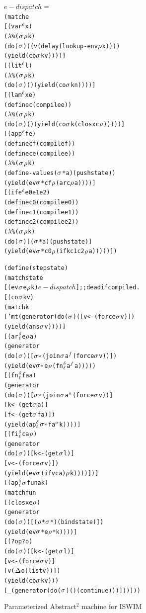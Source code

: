 \documentclass[preprint,onecolumn,9pt]{sigplanconf} %
\begin{document}
\begin{figure}
\begin{alltt}
\(e-dispatch =\)
(match e
  [(var\(\superscript\mlab\) x)
   (\(\lambda\)\% (\(\msto\) \(\menv\) k)
    (do (\(\msto\)) ((v (delay (lookup-env \(\menv\) x))))
      (yield (co \(\msto\) k v))))]
  [(lit\(\superscript\mlab\) l)
   (\(\lambda\)\% (\(\msto\) \(\menv\) k)
    (do (\(\msto\)) () (yield (co \(\msto\) k n))))]
  [(lam\(\superscript\mlab\) x e)
   (define c (compile e))
   (\(\lambda\)\% (\(\msto\) \(\menv\) k)
    (do (\(\msto\)) () (yield (co \(\msto\) k (clos x c \(\menv\))))))]
  [(app\(\superscript\mlab\) f e)
   (define cf (compile f))
   (define ce (compile e))
   (\(\lambda\)\% (\(\msto\) \(\menv\) k)
    (define-values (\(\msto\)* a) (push state))
    (yield (ev \(\msto\)* cf \(\menv\) (ar c \(\menv\) a))))]
  [(ife\(\superscript\mlab\) e0 e1 e2)
   (define c0 (compile e0))
   (define c1 (compile e1))
   (define c2 (compile e2))
   (\(\lambda\)\% (\(\msto\) \(\menv\) k)
     (do (\(\msto\)) [(\(\msto\)* a) (push state)]
      (yield (ev \(\msto\)* c0 \(\menv\) (ifk c1 c2 \(\menv\) a)))))])

(define (step state)
  (match state
    [(ev \(\msto\) e \(\menv\) k) \(e-dispatch\)] ;; dead if compiled.
    [(co \(\msto\) k v)
     (match k
       ['mt (generator (do (\(\msto\)) ([v <- (force \(\msto\) v)])
        (yield (ans \(\msto\) v))))]
       [(ar\(\superscript\mcntr\subscript\mlab\) e \(\menv\) a)
        (generator
         (do (\(\msto\)) ([\(\msto*\) (join \(\msto\) a\(\superscript{f}\) (force \(\msto\) v))])
           (yield (ev \(\msto*\) e \(\menv\) (fn\(\superscript\mcntr\subscript\mlab\) a\(\superscript{f}\) a)))))
       [(fn\(\superscript\mcntr\subscript\mlab\) fa a)
        (generator
         (do (\(\msto\)) ([\(\msto*\) (join \(\msto\) a\(\superscript{a}\) (force \(\msto\) v))]
                  [k <- (get \(\msto\) a)]
                  [f <- (get \(\msto\) fa)])
           (yield (ap\(\superscript\mcntr\subscript\mlab\) \(\msto*\) f a\(\superscript{a}\) k))))]
       [(fi\(\superscript\mcntr\subscript\mlab\) c a \(\menv\))
        (generator
         (do (\(\msto\)) ([k <- (get \(\msto\) l)]
                  [v <- (force \(\msto\) v)])
           (yield (ev \(\msto\) (if v c a) \(\menv\) k))))])]
    [(ap\(\superscript\mcntr\subscript\mlab\) \(\msto\) fun a k)
     (match fun
       [(clos x e \(\menv\))
        (generator
         (do (\(\msto\)) ([(\(\menv\)* \(\msto\)*) (bind state)])
           (yield (ev \(\msto\)* e \(\menv\)* k))))]
       [(? op? o)
        (do (\(\msto\)) ([k <- (get \(\msto\) l)]
                 [v <- (force \(\msto\) v)]
                 [v (\(\interpdelta\) o (list v))])
          (yield (co \(\msto\) k v)))
       [_ (generator (do (\(\msto\)) () (continue)))]))]))
\end{alltt}
\caption{Parameterized Abstract$^2$ machine for ISWIM}
\label{fig:paam}
\end{figure}
\end{document}
